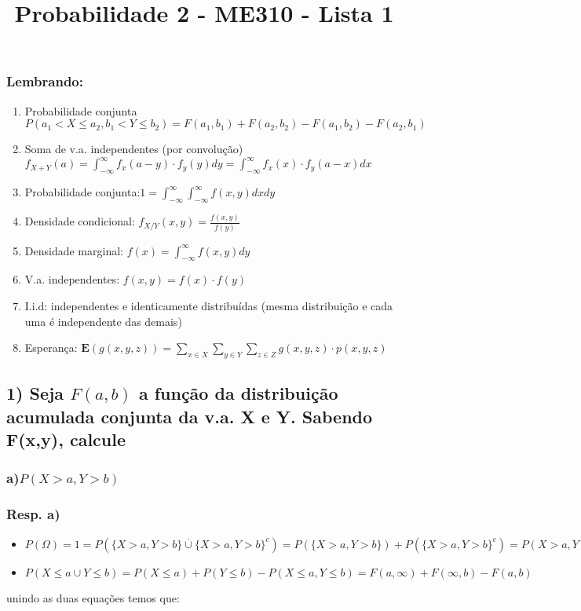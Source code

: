 \documentclass[english]{article}
\begin{document}
\title{Probabilidade 2 - ME310 - Lista 1}

\maketitle

\subsubsection*{Lembrando:}
\begin{enumerate}
\item Probabilidade conjunta $P(a_{1}<X\leq a_{2},b_{1}<Y\leq b_{2})=F(a_{1},b_{1})+F(a_{2},b_{2})-F(a_{1},b_{2})-F(a_{2},b_{1})$
\item Soma de v.a. independentes (por convolução) $f_{X+Y}(a)=\int_{-\infty}^{\infty}f_{x}(a-y)\cdot f_{y}(y)dy=\int_{-\infty}^{\infty}f_{x}(x)\cdot f_{y}(a-x)dx$
\item Probabilidade conjunta:$1=\int_{-\infty}^{\infty}\int_{-\infty}^{\infty}f(x,y)dxdy$
\item Densidade condicional: $f_{X/Y}(x,y)=\frac{f(x,y)}{f(y)}$
\item Densidade marginal: $f(x)=\int_{-\infty}^{\infty}f(x,y)dy$
\item V.a. independentes: $f(x,y)=f(x)\cdot f(y)$
\item I.i.d: independentes e identicamente distribuídas (mesma distribuição
e cada uma é independente das demais)
\item Esperança: $\mathbf{E}(g(x,y,z))=\sum_{x\in X}\sum_{y\in Y}\sum_{z\in Z}g(x,y,z)\cdot p(x,y,z)$
\end{enumerate}
\pagebreak{}


\subsection*{\textmd{1) Seja $F(a,b)$ a função da distribuição acumulada conjunta
da v.a. X e Y. Sabendo F(x,y), calcule }}


\subsubsection*{\textmd{a)$P(X>a,Y>b)$ }}


\subsubsection*{\textmd{Resp. a)}}
\begin{itemize}
\item $P(\Omega)=1=P(\{X>a,Y>b\}\overset{.}{\cup}\{X>a,Y>b\}^{c})=P(\{X>a,Y>b\})+P(\{X>a,Y>b\}^{c})=P(X>a,Y>b)+P(X\leq a\cup Y\leq b)$
\item $P(X\leq a\cup Y\leq b)=P(X\leq a)+P(Y\leq b)-P(X\leq a,Y\leq b)=F(a,\infty)+F(\infty,b)-F(a,b)$
\end{itemize}
unindo as duas equações temos que:
\end{document}
